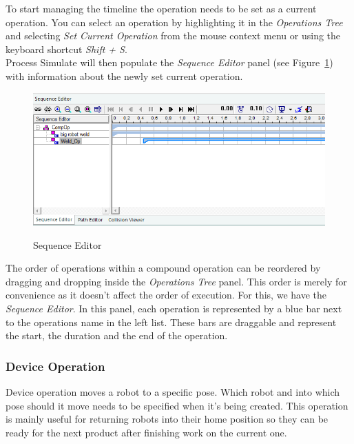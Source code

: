 To start managing the timeline the operation needs to be set as a current operation. 
You can select an operation by highlighting it in the \emph{Operations Tree} and selecting \emph{Set Current Operation} from the mouse context menu or using the keyboard shortcut \emph{Shift + S}. \\

Process Simulate will then populate the \emph{Sequence Editor} panel (see Figure~\ref{fig:SequenceEditor}) with information about the newly set current operation. \\

\begin{figure}[H]
    \caption{Sequence Editor}
    \centering
    \includegraphics[width=\textwidth]{sequence_editor}
    \label{fig:SequenceEditor}
\end{figure}

The order of operations within a compound operation can be reordered by dragging and dropping inside the \emph{Operations Tree} panel.
This order is merely for convenience as it doesn't affect the order of execution.
For this, we have the \emph{Sequence Editor}. 
In this panel, each operation is represented by a blue bar next to the operations name in the left list. 
These bars are draggable and represent the start, the duration and the end of the operation. \\

\subsubsection{Device Operation}
Device operation moves a robot to a specific pose.
Which robot and into which pose should it move needs to be specified when it's being created.
This operation is mainly useful for returning robots into their home position so they can be ready for the next product after finishing work on the current one. \\

